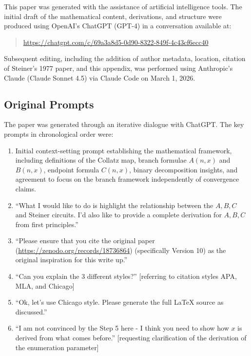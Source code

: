 \documentclass[12pt]{article}
\begin{document}
This paper was generated with the assistance of artificial intelligence tools.
The initial draft of the mathematical content, derivations, and structure were
produced using OpenAI's ChatGPT (GPT-4) in a conversation available at:

\begin{quote}
\url{https://chatgpt.com/c/69a3a8d5-0d90-8322-849f-4c43cf6ecc40}
\end{quote}

Subsequent editing, including the addition of author metadata, location,
citation of Steiner's 1977 paper, and this appendix, was performed using
Anthropic's Claude (Claude Sonnet 4.5) via Claude Code on March 1, 2026.

\subsection*{Original Prompts}

The paper was generated through an iterative dialogue with ChatGPT. The
key prompts in chronological order were:

\begin{enumerate}
\item Initial context-setting prompt establishing the mathematical framework,
including definitions of the Collatz map, branch formulae \(A(n,x)\) and
\(B(n,x)\), endpoint formula \(C(n,x)\), binary decomposition insights, and
agreement to focus on the branch framework independently of convergence claims.

\item ``What I would like to do is highlight the relationship between the
\(A,B,C\) and Steiner circuits. I'd also like to provide a complete derivation
for \(A,B,C\) from first principles.''

\item ``Please ensure that you cite the original paper
(\url{https://zenodo.org/records/18736864}) (specifically Version 10) as the
original inspiration for this write up.''

\item ``Can you explain the 3 different styles?'' [referring to citation styles
APA, MLA, and Chicago]

\item ``Ok, let's use Chicago style. Please generate the full LaTeX source as
discussed.''

\item ``I am not convinced by the Step 5 here - I think you need to show how
\(x\) is derived from what comes before.'' [requesting clarification of the
derivation of the enumeration parameter]
\end{enumerate}
\end{document}
